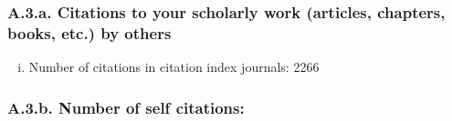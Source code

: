
\subsubsection*{A.3.a. Citations to your scholarly work (articles, chapters, books, etc.) by others}

\begin{enumerate}[i)]

\item  Number of citations in citation index journals:	2266

\end{enumerate}

\subsubsection*{A.3.b. Number of self citations:}


